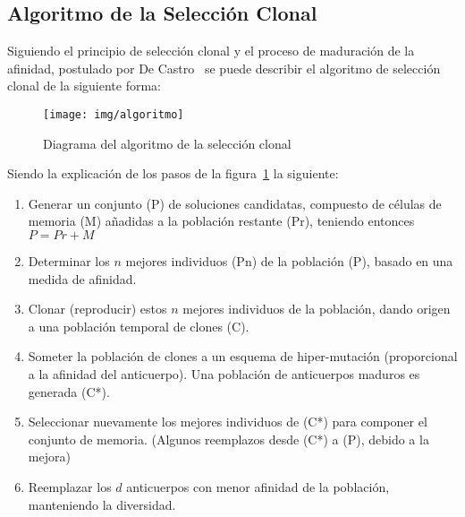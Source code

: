 \subsection{Algoritmo de la Selección Clonal}

Siguiendo el principio de selección clonal y el proceso de maduración de la afinidad, postulado por De Castro~\cite{decastro} se puede describir el algoritmo de selección clonal de la siguiente forma:
\begin{figure}[h!]
\begin{center}
\texttt{[image: img/algoritmo]}
\end{center}
\caption{Diagrama del algoritmo de la selección clonal}
\label{fig:algoritmo}
\end{figure}

Siendo la explicación de los pasos de la figura~\ref{fig:algoritmo} la siguiente:
\begin{enumerate}
    \item Generar un conjunto (P) de soluciones candidatas, compuesto de células de memoria (M) añadidas a la población restante (Pr), teniendo entonces $P = Pr + M$
    \item Determinar los $n$ mejores individuos (Pn) de la población (P), basado en una medida de afinidad.
    \item Clonar (reproducir) estos $n$ mejores individuos de la población, dando origen a una población temporal de clones (C).
    \item Someter la población de clones a un esquema de hiper-mutación (proporcional a la afinidad del anticuerpo). Una población de anticuerpos maduros es generada (C*).
    \item Seleccionar nuevamente los mejores individuos de (C*) para componer el conjunto de memoria. (Algunos reemplazos desde (C*) a (P), debido a la mejora)
    \item Reemplazar los $d$ anticuerpos con menor afinidad de la población, manteniendo la diversidad.
\end{enumerate}

